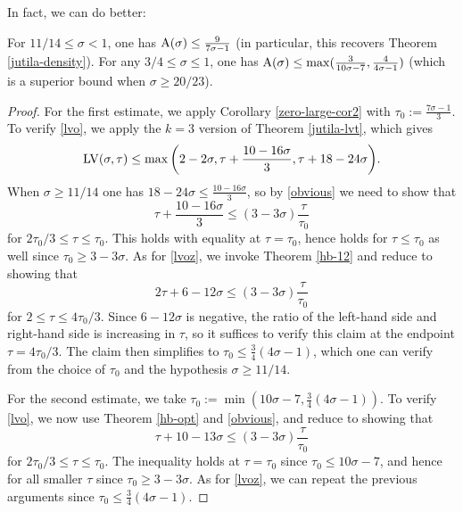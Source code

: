 In fact, we can do better:

\begin{theorem}\label{hb-density} \cite{heathbrown_zero_1979} For $11/14 \leq \sigma < 1$, one has $\mathrm{A}(\sigma) \leq \frac{9}{7\sigma - 1}$ (in particular, this recovers Theorem \ref{jutila-density}).  For any $3/4 \leq \sigma \leq 1$, one has $\mathrm{A}(\sigma) \leq \max(\frac{3}{10\sigma-7}, \frac{4}{4\sigma-1})$ (which is a superior bound when $\sigma \geq 20/23$).
\end{theorem}
\literature
{}
\derived
{}

\begin{proof} For the first estimate, we apply Corollary \ref{zero-large-cor2} with $\tau_0 := \frac{7\sigma-1}{3}$.  To verify \eqref{lvo}, we apply the $k=3$ version of Theorem \ref{jutila-lvt}, which gives
$$ \mathrm{LV}(\sigma,\tau) \leq \max \bigg( 2-2\sigma, \tau + \frac{10-16\sigma}{3}, \tau + 18-24\sigma \bigg).$$
When $\sigma \geq 11/14$ one has $18-24\sigma \leq \frac{10-16\sigma}{3}$, so by \eqref{obvious} we need to show that
$$ \tau + \frac{10-16\sigma}{3} \leq (3-3\sigma) \frac{\tau}{\tau_0}$$
for $2\tau_0/3 \leq \tau \leq \tau_0$.  This holds with equality at $\tau=\tau_0$, hence holds for $\tau \leq \tau_0$ as well since $\tau_0 \geq 3-3\sigma$.  As for \eqref{lvoz}, we invoke Theorem \ref{hb-12} and reduce to showing that
$$ 2\tau + 6 - 12\sigma \leq (3-3\sigma) \frac{\tau}{\tau_0}$$
for $2 \leq \tau \leq 4\tau_0/3$.  Since $6-12\sigma$ is negative, the ratio of the left-hand side and right-hand side is increasing in $\tau$, so it suffices to verify this claim at the endpoint $\tau = 4\tau_0/3$.  The claim then simplifies to $\tau_0 \leq \frac{3}{4} (4\sigma-1)$, which one can verify from the choice of $\tau_0$ and the hypothesis $\sigma \geq 11/14$.

For the second estimate, we take $\tau_0 := \min( 10\sigma-7, \frac{3}{4} (4\sigma-1))$.  To verify \eqref{lvo}, we now use Theorem \ref{hb-opt} and \eqref{obvious}, and reduce to showing that
$$ \tau + 10-13\sigma \leq (3-3\sigma) \frac{\tau}{\tau_0}$$
for $2\tau_0/3 \leq \tau \leq \tau_0$.  The inequality holds at $\tau=\tau_0$ since $\tau_0 \leq 10\sigma-7$, and hence for all smaller $\tau$ since $\tau_0 \geq 3-3\sigma$.  As for \eqref{lvoz}, we can repeat the previous arguments since $\tau_0 \leq \frac{3}{4} (4\sigma-1)$.
\end{proof}

